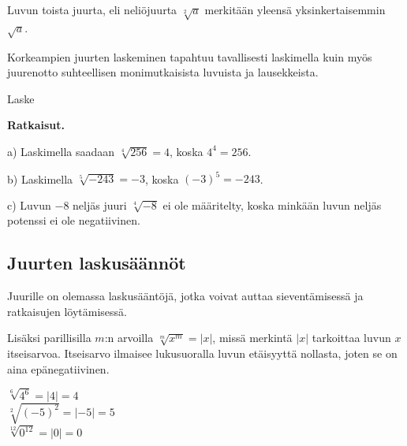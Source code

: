 Luvun toista juurta, eli neliöjuurta $\sqrt[2]{a}$ merkitään yleensä yksinkertaisemmin $\sqrt{a}$.


Korkeampien juurten laskeminen tapahtuu tavallisesti laskimella kuin myös juurenotto suhteellisen monimutkaisista luvuista ja lausekkeista.

\begin{esimerkki}
Laske

{\bf Ratkaisut.}

a) Laskimella saadaan $\sqrt[4]{256}=4$, koska $4^4=256$.

b) Laskimella $\sqrt[5]{-243}=-3$, koska $(-3)^5=-243$.

c) Luvun $-8$ neljäs juuri $\sqrt[4]{-8}$ ei ole määritelty, koska minkään luvun neljäs potenssi ei ole negatiivinen.
\end{esimerkki}



\subsection*{Juurten laskusäännöt}
Juurille on olemassa laskusääntöjä, jotka voivat auttaa sieventämisessä ja ratkaisujen löytämisessä. 

Lisäksi parillisilla $m$:n arvoilla $\sqrt[m]{x^m}=|x|$, missä merkintä $|x|$ tarkoittaa luvun $x$ itseisarvoa. Itseisarvo ilmaisee lukusuoralla luvun etäisyyttä nollasta, joten se on aina epänegatiivinen.

\begin{esimerkki}
$\sqrt[6]{4^6}=|4| = 4$\\
$\sqrt[2]{(-5)^2}=|-5| = 5$\\
$\sqrt[12]{0^{12}}=|0|=0$
\end{esimerkki}

